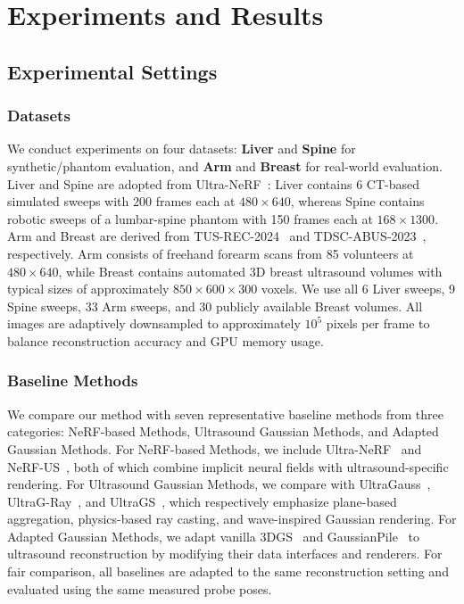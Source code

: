 \vspace{-1mm}
\section{Experiments and Results}
\label{sec:experiments}
\label{sec:results}

\subsection{Experimental Settings}
\label{sec:experiments:settings}

\subsubsection{Datasets}
\label{sec:experiments:datasets}

We conduct experiments on four datasets: \textbf{Liver} and \textbf{Spine}
for synthetic/phantom evaluation, and \textbf{Arm} and \textbf{Breast} for
real-world evaluation. Liver and Spine are adopted from
Ultra-NeRF~\cite{wysockiUltraNeRFNeuralRadiance2024}: Liver contains 6
CT-based simulated sweeps with 200 frames each at $480\times640$, whereas
Spine contains robotic sweeps of a lumbar-spine phantom with 150 frames each
at $168\times1300$. Arm and Breast are derived from
TUS-REC-2024~\cite{liTUSREC2024} and
TDSC-ABUS-2023~\cite{luoTDSCABUSChallenge2025}, respectively. Arm consists of
freehand forearm scans from 85 volunteers at $480\times640$, while Breast
contains automated 3D breast ultrasound volumes with typical sizes of
approximately $850\times600\times300$ voxels. We use all 6 Liver sweeps, 9
Spine sweeps, 33 Arm sweeps, and 30 publicly available Breast volumes. 
All images are adaptively downsampled to approximately $10^5$ pixels per frame
to balance reconstruction accuracy and GPU memory usage.

\subsubsection{Baseline Methods}
\label{sec:experiments:baselines}

We compare our method with seven representative baseline methods from three
categories: NeRF-based Methods, Ultrasound Gaussian Methods, and Adapted
Gaussian Methods. For NeRF-based Methods, we include
Ultra-NeRF~\cite{wysockiUltraNeRFNeuralRadiance2024} and
NeRF-US~\cite{dagliNeRFUSRemovingUltrasound2024}, both of which
combine implicit neural fields with ultrasound-specific rendering. For
Ultrasound Gaussian Methods, we compare with
UltraGauss~\cite{eidUltraGaussUltrafastGaussian2025},
UltraG-Ray~\cite{duelmerUltraGRayPhysicsBasedGaussian2026}, and
UltraGS~\cite{yangUltraGSRealTimePhysicallyDecoupled2025}, which respectively
emphasize plane-based aggregation, physics-based ray casting, and wave-inspired
Gaussian rendering. For Adapted Gaussian Methods, we adapt vanilla
3DGS~\cite{kerbl3DGaussianSplatting2023} and
GaussianPile~\cite{kongGaussianPileUnifiedSparse2026} to ultrasound
reconstruction by modifying their data interfaces and renderers.
For fair comparison, all baselines are adapted to the same reconstruction
setting and evaluated using the same measured probe poses.

